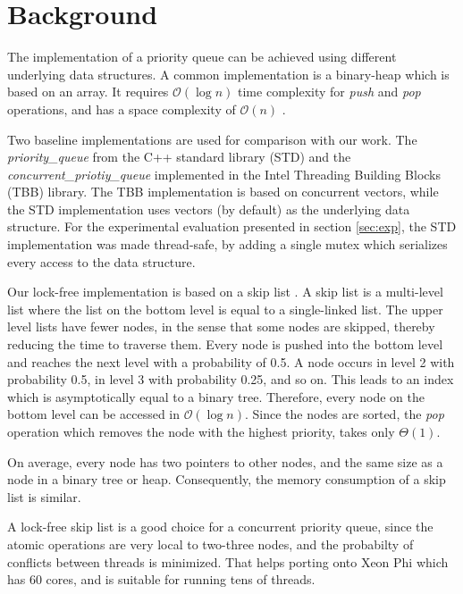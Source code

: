 \section{Background}
\label{sec:background}

The implementation of a priority queue can be achieved using different underlying data structures.
A common implementation is a binary-heap which is based on an array. It requires $\mathcal{O}(\log{}n)$ time complexity for \textit{push} and \textit{pop} operations, and has a space complexity of $\mathcal{O}(n)$ .

Two baseline implementations are used for comparison with our work.
The \textit{priority\_queue} from the C++ standard library (STD) and the \textit{concurrent\_priotiy\_queue} implemented in the Intel Threading Building Blocks (TBB) library.
The TBB implementation is based on concurrent vectors, while the STD implementation uses vectors (by default) as the underlying data structure.
For the experimental evaluation presented in section \ref{sec:exp}, the STD implementation was made thread-safe, by adding a single mutex which serializes every access to the data structure.

Our lock-free implementation is based on a skip list \cite{Pugh:1990:SLP:78973.78977}.
A skip list is a multi-level list where the list on the bottom level is equal to a single-linked list.
The upper level lists have fewer nodes, in the sense that some nodes are skipped, thereby reducing the time to traverse them.
Every node is pushed into the bottom level and reaches the next level with a probability of 0.5.
A node occurs in level 2 with probability 0.5, in level 3 with probability 0.25, and so on.
This leads to an index which is asymptotically equal to a binary tree.
Therefore, every node on the bottom level can be accessed in $\mathcal{O}(\log{}n)$.
Since the nodes are sorted, the \textit{pop} operation which removes the node with the highest priority, takes only $\Theta(1)$.

On average, every node has two pointers to other nodes, and the same size as a node in a binary tree or heap.
Consequently, the memory consumption of a skip list is similar.

A lock-free skip list is a good choice for a concurrent priority queue, since the atomic operations are very local to two-three nodes, and the probabilty of conflicts between threads is minimized.
That helps porting onto Xeon Phi which has 60 cores, and is suitable for running tens of threads.
